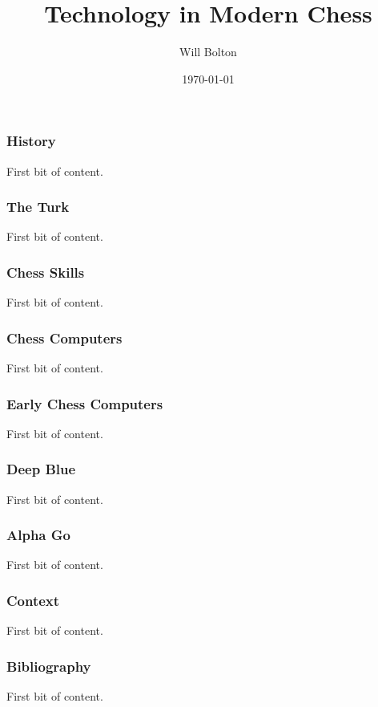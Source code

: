 \documentclass{beamer}
\title[Technology in Modern Chess]{Technology in Modern Chess}
\author{Will Bolton}
\date{\today}
\begin{document}
\titlepage %

\begin{frame} %
\frametitle{History}
First bit of content.
\end{frame}

\begin{frame} %
\frametitle{The Turk}
First bit of content.
\end{frame}

\begin{frame} %
\frametitle{Chess Skills}
First bit of content.
\end{frame}

\begin{frame} %
\frametitle{Chess Computers}
First bit of content.
\end{frame}

\begin{frame} %
\frametitle{Early Chess Computers}
First bit of content.
\end{frame}

\begin{frame} %
\frametitle{Deep Blue}
First bit of content.
\end{frame}

\begin{frame} %
\frametitle{Alpha Go}
First bit of content.
\end{frame}

\begin{frame} %
\frametitle{Context}
First bit of content.
\end{frame}

\begin{frame} %
\frametitle{Bibliography}
First bit of content.
\end{frame}
\end{document}
